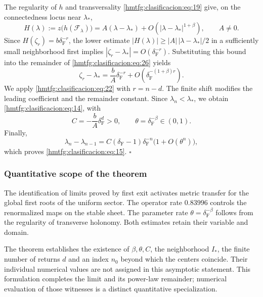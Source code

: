 The regularity of \(h\) and transversality \eqref{hmtfg:clasificacion:eq:19} give, on the connectedness locus near \(\lambda_*\),
\begin{equation}
H(\lambda):=z\bigl(h(\mathcal F_\lambda)\bigr)
=A(\lambda-\lambda_*)
+O\!\left(|\lambda-\lambda_*|^{1+\beta}\right),
\qquad A\ne0.
\label{hmtfg:clasificacion:eq:26}
\end{equation}
Since \(H(\zeta_r)=b\delta_{\mathrm F}^{-r}\), the lower estimate
\(|H(\lambda)|\ge |A|\,|\lambda-\lambda_*|/2\) in a sufficiently small neighborhood first implies
\(|\zeta_r-\lambda_*|=O(\delta_{\mathrm F}^{-r})\). Substituting this bound into the remainder of \eqref{hmtfg:clasificacion:eq:26} yields
\begin{equation}
\zeta_r-\lambda_*=\frac bA\delta_{\mathrm F}^{-r}
+O\!\left(\delta_{\mathrm F}^{-(1+\beta)r}\right).
\label{hmtfg:clasificacion:eq:27}
\end{equation}
We apply \eqref{hmtfg:clasificacion:eq:22} with \(r=n-d\). The finite shift modifies the leading coefficient and the remainder constant. Since \(\lambda_n<\lambda_*\), we obtain \eqref{hmtfg:clasificacion:eq:14}, with
\[
C=-\frac bA\delta_{\mathrm F}^d>0,
\qquad \theta=\delta_{\mathrm F}^{-\beta}\in(0,1).
\]
Finally,
\[
\lambda_n-\lambda_{n-1}
=C(\delta_{\mathrm F}-1)\delta_{\mathrm F}^{-n}\bigl(1+O(\theta^n)\bigr),
\]
which proves \eqref{hmtfg:clasificacion:eq:15}. \(\square\)


\subsubsection{Quantitative scope of the theorem}
\label{hmtfg:clasificacion:8.5}

The identification of limits proved by first exit activates metric transfer for the global first roots of the uniform sector. The operator rate \(0.83996\) controls the renormalized maps on the stable sheet. The parameter rate \(\theta=\delta_{\mathrm F}^{-\beta}\) follows from the regularity of transverse holonomy. Both estimates retain their variable and domain.

The theorem establishes the existence of \(\beta,\theta,C\), the neighborhood \(I_*\), the finite number of returns \(d\) and an index \(n_0\) beyond which the centers coincide. Their individual numerical values are not assigned in this asymptotic statement. This formulation completes the limit and its power-law remainder; numerical evaluation of those witnesses is a distinct quantitative specialization.
